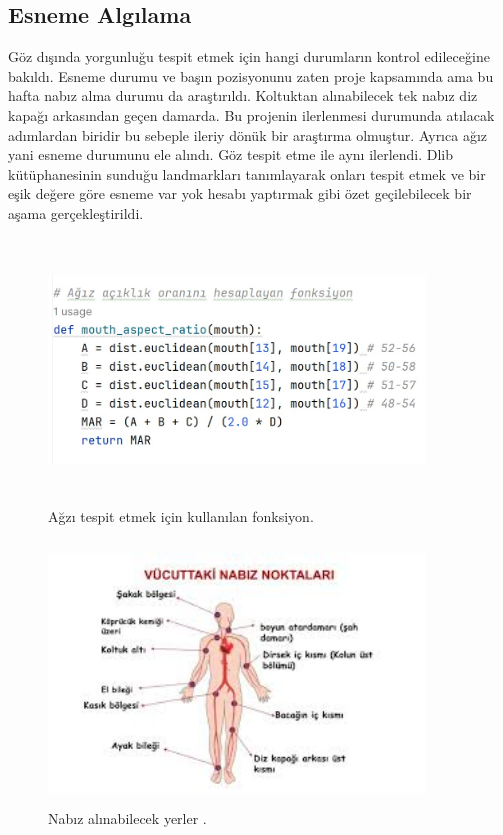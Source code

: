 \documentclass[12pt, a4paper]{article}
\begin{document}
	\subsection{ Esneme Algılama }
	Göz dışında yorgunluğu tespit etmek için hangi durumların kontrol edileceğine bakıldı. Esneme durumu ve başın pozisyonunu zaten proje kapsamında ama bu hafta nabız alma durumu da araştırıldı. Koltuktan alınabilecek tek nabız diz kapağı arkasından geçen damarda. Bu projenin ilerlenmesi durumunda atılacak adımlardan  biridir bu sebeple ileriy dönük bir araştırma olmuştur. 
	Ayrıca ağız yani esneme durumunu ele alındı. Göz tespit etme ile aynı ilerlendi. Dlib kütüphanesinin sunduğu landmarkları tanımlayarak onları tespit etmek ve bir eşik değere göre esneme var yok hesabı yaptırmak gibi özet geçilebilecek bir aşama gerçekleştirildi.
	\begin{figure}[htbp]
		\centering
		\includegraphics[width=10cm, height=7cm, keepaspectratio]{esneme.jpg}
		\caption{Ağzı tespit etmek için kullanılan fonksiyon.}
	\end{figure}
	\begin{figure}[htbp]
		\centering
		\includegraphics[width=10cm, height=7cm, keepaspectratio]{nabiz.jpeg}
		\caption{Nabız alınabilecek yerler \cite{tuyobank}.}
	\end{figure}\newpage
\end{document}

